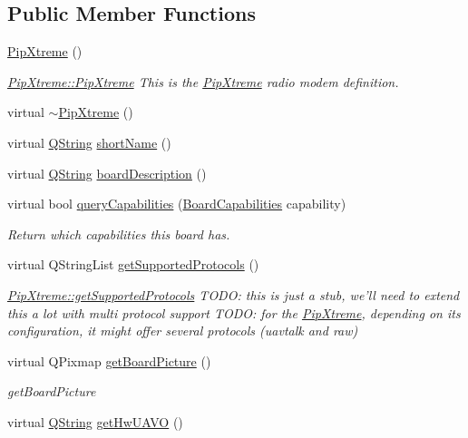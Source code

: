 \subsection*{\-Public \-Member \-Functions}
\begin{DoxyCompactItemize}
\item 
\hyperlink{group___boards___open_pilot_plugin_ga933d096d4ca64fb4d20fc5501d21fe24}{\-Pip\-Xtreme} ()
\begin{DoxyCompactList}\small\item\em \hyperlink{group___boards___open_pilot_plugin_ga933d096d4ca64fb4d20fc5501d21fe24}{\-Pip\-Xtreme\-::\-Pip\-Xtreme} \-This is the \hyperlink{class_pip_xtreme}{\-Pip\-Xtreme} radio modem definition. \end{DoxyCompactList}\item 
virtual \hyperlink{group___boards___open_pilot_plugin_ga6a493453ee4e734933fca8caf5b92b7c}{$\sim$\-Pip\-Xtreme} ()
\item 
virtual \hyperlink{group___u_a_v_objects_plugin_gab9d252f49c333c94a72f97ce3105a32d}{\-Q\-String} \hyperlink{group___boards___open_pilot_plugin_ga3267a634ade3947a6463a2aaae145c1b}{short\-Name} ()
\item 
virtual \hyperlink{group___u_a_v_objects_plugin_gab9d252f49c333c94a72f97ce3105a32d}{\-Q\-String} \hyperlink{group___boards___open_pilot_plugin_ga31e2251cfd285fe24c515d5ee2e53062}{board\-Description} ()
\item 
virtual bool \hyperlink{group___boards___open_pilot_plugin_ga4cb0d73f85ef11bb262d9d0a94c7b033}{query\-Capabilities} (\hyperlink{group___core_plugin_ga01b09218f2a13aaeee6db007ac6bd967}{\-Board\-Capabilities} capability)
\begin{DoxyCompactList}\small\item\em \-Return which capabilities this board has. \end{DoxyCompactList}\item 
virtual \-Q\-String\-List \hyperlink{group___boards___open_pilot_plugin_gac32d0b331396845ce602cc74ff751d83}{get\-Supported\-Protocols} ()
\begin{DoxyCompactList}\small\item\em \hyperlink{group___boards___open_pilot_plugin_gac32d0b331396845ce602cc74ff751d83}{\-Pip\-Xtreme\-::get\-Supported\-Protocols} \-T\-O\-D\-O\-: this is just a stub, we'll need to extend this a lot with multi protocol support \-T\-O\-D\-O\-: for the \hyperlink{class_pip_xtreme}{\-Pip\-Xtreme}, depending on its configuration, it might offer several protocols (uavtalk and raw) \end{DoxyCompactList}\item 
virtual \-Q\-Pixmap \hyperlink{group___boards___open_pilot_plugin_gabfd6ccc67c330f1ffdcfdac97cc864f9}{get\-Board\-Picture} ()
\begin{DoxyCompactList}\small\item\em get\-Board\-Picture \end{DoxyCompactList}\item 
virtual \hyperlink{group___u_a_v_objects_plugin_gab9d252f49c333c94a72f97ce3105a32d}{\-Q\-String} \hyperlink{group___boards___open_pilot_plugin_gad8bc1cdc90506b5549224c5c40b835ce}{get\-Hw\-U\-A\-V\-O} ()
\end{DoxyCompactItemize}
